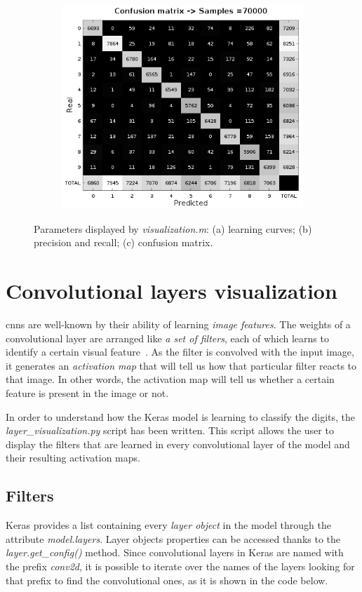 \begin{figure}
\begin{subfigure}{0.5\textwidth}
		\includegraphics[width=1\linewidth]{figures/conf_mat.png}
		\caption{}
	\end{subfigure}
	\caption{Parameters displayed by \textit{visualization.m}: (a) learning curves; (b) precision and recall; (c) confusion matrix.}
	\label{fig:benchmark}
\end{figure}

\section{Convolutional layers visualization}\label{sec:visualization}
\glspl{cnn} are well-known by their ability of learning \emph{image features}. The weights of a convolutional layer are arranged like \emph{a set of filters}, each of which learns to identify a certain visual feature~\cite{cs231n}. As the filter is convolved with the input image, it generates an \emph{activation map} that will tell us how that particular filter reacts to that image. In other words, the activation map will tell us whether a certain feature is present in the image or not.

In order to understand how the Keras model is learning to classify the digits, the \emph{\textit{layer\_visualization.py}} script has been written. This script allows the user to display the filters that are learned in every convolutional layer of the model and their resulting activation maps.

\subsection{Filters}
Keras provides a list containing every \emph{layer object} in the model through the attribute \textit{model.layers}. Layer objects properties can be accessed thanks to the \textit{layer.get\_config()} method. Since convolutional layers in Keras are named with the prefix \textit{conv2d}, it is possible to iterate over the names of the layers looking for that prefix to find the convolutional ones, as it is shown in the code below.

